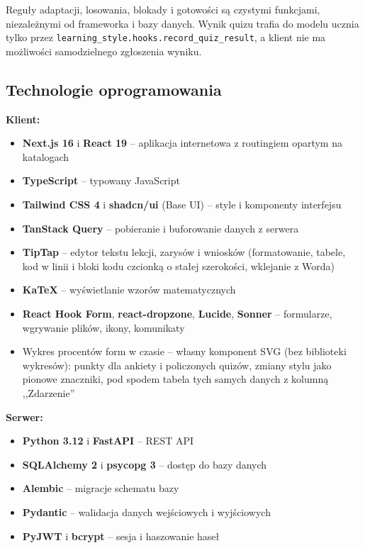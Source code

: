 Reguły adaptacji, losowania, blokady i gotowości są czystymi funkcjami, niezależnymi od frameworka i bazy danych. Wynik quizu trafia do modelu ucznia tylko przez \texttt{learning\_style.hooks.record\_quiz\_result}, a klient nie ma możliwości samodzielnego zgłoszenia wyniku.

\subsection{Technologie oprogramowania}

\textbf{Klient:}
\begin{itemize}[leftmargin=*]
    \item \textbf{Next.js 16} i \textbf{React 19} -- aplikacja internetowa z routingiem opartym na katalogach
    \item \textbf{TypeScript} -- typowany JavaScript
    \item \textbf{Tailwind CSS 4} i \textbf{shadcn/ui} (Base UI) -- style i komponenty interfejsu
    \item \textbf{TanStack Query} -- pobieranie i buforowanie danych z serwera
    \item \textbf{TipTap} -- edytor tekstu lekcji, zarysów i wniosków (formatowanie, tabele, kod w linii i bloki kodu czcionką o stałej szerokości, wklejanie z Worda)
    \item \textbf{KaTeX} -- wyświetlanie wzorów matematycznych
    \item \textbf{React Hook Form}, \textbf{react-dropzone}, \textbf{Lucide}, \textbf{Sonner} -- formularze, wgrywanie plików, ikony, komunikaty
    \item Wykres procentów form w czasie -- własny komponent SVG (bez biblioteki wykresów): punkty dla ankiety i policzonych quizów, zmiany stylu jako pionowe znaczniki, pod spodem tabela tych samych danych z kolumną ,,Zdarzenie''
\end{itemize}

\textbf{Serwer:}
\begin{itemize}[leftmargin=*]
    \item \textbf{Python 3.12} i \textbf{FastAPI} -- REST API
    \item \textbf{SQLAlchemy 2} i \textbf{psycopg 3} -- dostęp do bazy danych
    \item \textbf{Alembic} -- migracje schematu bazy
    \item \textbf{Pydantic} -- walidacja danych wejściowych i wyjściowych
    \item \textbf{PyJWT} i \textbf{bcrypt} -- sesja i haszowanie haseł
\end{itemize}

